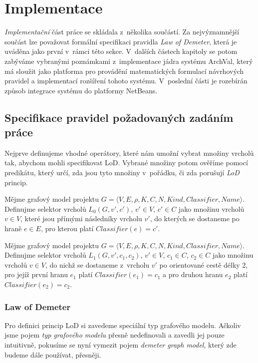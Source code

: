 \chapter{Implementace}
\label{implementation}
\emph{Implementační} část práce se skládala z~několika součástí. Za nejvýznamnější součást lze považovat formální specifikaci pravidla \emph{Law of Demeter}, která je uváděna jako první v~rámci této sekce. V~dalších částech kapitoly se potom zabýváme vybranými poznámkami z~implementace jádra systému ArchVal, který má sloužit jako platforma pro provádění matematických formulací návrhových pravidel a implementací rozšíření tohoto systému. V~poslední části je rozebírán způsob integrace systému do platformy NetBeans.

\section{Specifikace pravidel požadovaných zadáním práce}
Nejprve definujeme vhodné operátory, které nám umožní vybrat množiny vrcholů tak, abychom mohli specifikovat LoD. Vybrané množiny potom ověříme pomocí predikátu, který určí, zda jsou tyto množiny v~pořádku, či zda porušují \emph{LoD} princip.

\begin{definition}
Mějme grafový model projektu $G = \langle V, E, \rho, K, C, N, \mathit{Kind}, \mathit{Classifier}, \mathit{Name}\rangle$. Definujme selektor vrcholů $L_0(G, v', c')$, $v' \in V$, $c' \in C$ jako množinu vrcholů $v \in V$, které jsou přímými následníky vrcholu $v'$, do kterých se dostaneme po hraně $e \in E$, pro kterou platí $Classifier(e) = c' $.
\end{definition}

\begin{definition}
Mějme grafový model projektu $G = \langle V, E, \rho, K, C, N, \mathit{Kind}, \mathit{Classifier}, \mathit{Name}\rangle$. Definujme selektor vrcholů $L_1(G, v', c_1, c_2)$, $v' \in V$, $c_1 \in C$, $c_2 \in C$ jako množinu vrcholů $v \in V$, do nichž se dostaneme z~vrcholu $v'$ po orientované cestě délky 2, pro jejíž první hranu $e_1$ platí $Classifier(e_1) = c_1$ a pro druhou hranu $e_2$ platí $Classifier(e_2) = c_2$.
\end{definition}

\subsection{Law of Demeter}
\label{implementation-lod_specification}
Pro definici princip LoD si zavedeme speciální typ grafového modelu. Ačkoliv jsme pojem \emph{typ grafového modelu}  přesně nedefinovali a zavedli jej pouze intuitivně, pokusíme se nyní vymezit pojem \emph{demeter graph model}, který zde budeme dále používat, přesněji.

